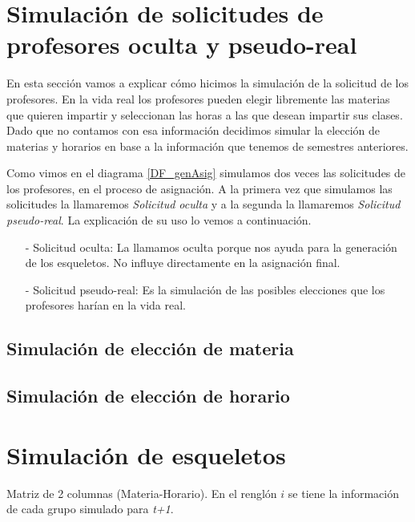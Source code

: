 \section{Simulación de solicitudes de profesores oculta y pseudo-real}

En esta sección vamos a explicar cómo hicimos la simulación de la solicitud de los profesores. En la vida real los profesores pueden elegir libremente las materias que quieren impartir y seleccionan las horas a las que desean impartir sus clases. Dado que no contamos con esa información decidimos simular la elección de materias y horarios en base a la información que tenemos de semestres anteriores.

Como vimos en el diagrama \ref{DF_genAsig} simulamos dos veces las solicitudes de los profesores, en el proceso de asignación. A la primera vez que simulamos las solicitudes la llamaremos \textit{Solicitud oculta} y a la segunda la llamaremos \textit{Solicitud pseudo-real}. La explicación de su uso lo vemos a continuación.

\begin{itemize}
\item[-] Solicitud oculta: La llamamos oculta porque nos ayuda para la generación de los esqueletos. No influye directamente en la asignación final.

\item[-] Solicitud pseudo-real: Es la simulación de las posibles elecciones que los profesores harían en la vida real.
\end{itemize}




\subsection{Simulación de elección de materia}

\subsection{Simulación de elección de horario}



\section{Simulación de esqueletos}

Matriz de 2 columnas (Materia-Horario). En el renglón $i$ se tiene la información de cada grupo simulado para \textit{t+1}.

